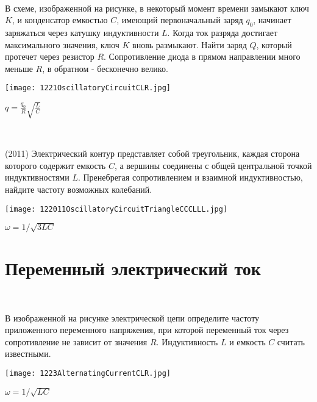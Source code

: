 \begin{ex}
\hspace{0pt} \\
\begin{minipage}{.65\textwidth}
В схеме, изображенной на рисунке, в некоторый момент времени замыкают ключ $K$, и конденсатор емкостью $C$, имеющий первоначальный заряд $q_0$, начинает заряжаться через катушку индуктивности $L$. 
Когда ток разряда достигает максимального значения, ключ $K$ вновь размыкают. Найти заряд $Q$, который протечет через резистор $R$. 
Сопротивление диода в прямом направлении много меньше $R$, в обратном - бесконечно велико.
\end{minipage}
\begin{minipage}{.35\textwidth}
\centering
\texttt{[image: 1221OscillatoryCircuitCLR.jpg]}
\end{minipage}
\begin{ans}
$q=\frac{q_0}{R}\sqrt{\frac{L}{C}}$
\end{ans}
\end{ex}

\begin{ex}
\hspace{0pt} \\
\begin{minipage}{.65\textwidth}
(2011) Электрический контур представляет собой треугольник, каждая сторона которого содержит емкость $C$, а вершины соединены с общей центральной точкой индуктивностями $L$. 
Пренебрегая сопротивлением и взаимной индуктивностью, найдите частоту возможных колебаний.
\end{minipage}
\begin{minipage}{.35\textwidth}
\centering
\texttt{[image: 122011OscillatoryCircuitTriangleCCCLLL.jpg]}
\end{minipage}
\begin{ans}
$\omega = 1/\sqrt{3LC}$
\end{ans}
\end{ex}

\section{Переменный электрический ток}

\begin{ex}
\hspace{0pt} \\
\begin{minipage}{.65\textwidth}
В изображенной на рисунке электрической цепи определите частоту приложенного переменного напряжения, при которой переменный ток через сопротивление не зависит от значения $R$. Индуктивность $L$ и емкость $C$ считать известными.
\end{minipage}
\begin{minipage}{.35\textwidth}
\centering
\texttt{[image: 1223AlternatingCurrentCLR.jpg]}
\end{minipage}
\begin{ans}
$\omega = 1/\sqrt{LC}$
\end{ans}
\end{ex}

